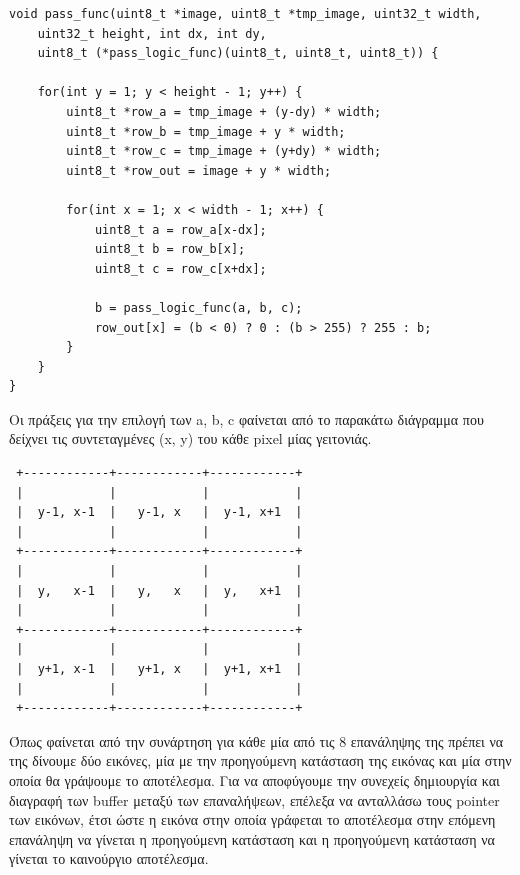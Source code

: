 \documentclass[12pt]{article}
\begin{document}
\newpage

\begin{verbatim}
void pass_func(uint8_t *image, uint8_t *tmp_image, uint32_t width,
    uint32_t height, int dx, int dy,
    uint8_t (*pass_logic_func)(uint8_t, uint8_t, uint8_t)) {

    for(int y = 1; y < height - 1; y++) {
        uint8_t *row_a = tmp_image + (y-dy) * width;
        uint8_t *row_b = tmp_image + y * width;
        uint8_t *row_c = tmp_image + (y+dy) * width;
        uint8_t *row_out = image + y * width;

        for(int x = 1; x < width - 1; x++) {
            uint8_t a = row_a[x-dx];
            uint8_t b = row_b[x];
            uint8_t c = row_c[x+dx];

            b = pass_logic_func(a, b, c);
            row_out[x] = (b < 0) ? 0 : (b > 255) ? 255 : b;
        }
    }
}
\end{verbatim}

Οι πράξεις για την επιλογή των a, b, c φαίνεται από το παρακάτω διάγραμμα που δείχνει τις συντεταγμένες (x, y) του κάθε pixel μίας γειτονιάς.

\vspace{0.3em}
\begin{center}
\begin{varwidth}{0.6\linewidth}
\begin{verbatim}
 +------------+------------+------------+ 
 |            |            |            | 
 |  y-1, x-1  |   y-1, x   |  y-1, x+1  | 
 |            |            |            | 
 +------------+------------+------------+ 
 |            |            |            | 
 |  y,   x-1  |   y,   x   |  y,   x+1  | 
 |            |            |            | 
 +------------+------------+------------+ 
 |            |            |            | 
 |  y+1, x-1  |   y+1, x   |  y+1, x+1  | 
 |            |            |            | 
 +------------+------------+------------+ 
\end{verbatim}
\end{varwidth}
\end{center}

Όπως φαίνεται από την συνάρτηση για κάθε μία από τις 8 επανάληψης της πρέπει να της δίνουμε δύο εικόνες, μία με την προηγούμενη κατάσταση της εικόνας και μία στην οποία θα γράψουμε το αποτέλεσμα. Για να αποφύγουμε την συνεχείς δημιουργία και διαγραφή των buffer μεταξύ των επαναλήψεων, επέλεξα να ανταλλάσω τους pointer των εικόνων, έτσι ώστε η εικόνα στην οποία γράφεται το αποτέλεσμα στην επόμενη επανάληψη να γίνεται η προηγούμενη κατάσταση και η προηγούμενη κατάσταση να γίνεται το καινούργιο αποτέλεσμα.
\end{document}
